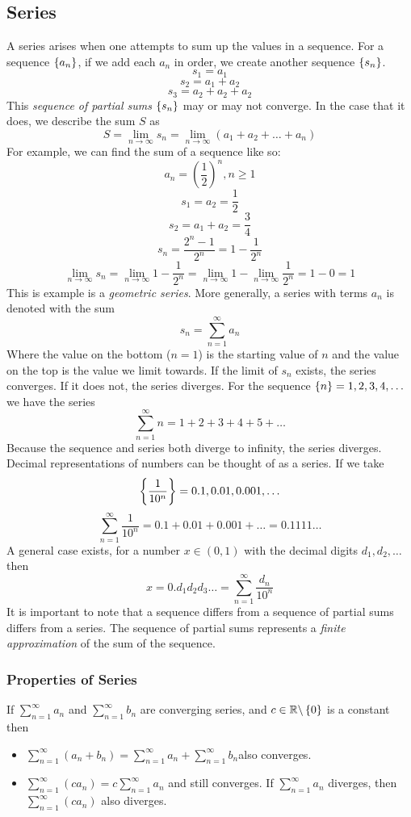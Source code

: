 \documentclass[12pt]{report}
\newcommand{\R}{\mathbb{R}}
\newcommand{\limit}{\lim\limits}
\newcommand{\sumninf}[1][1]{\sum\limits_{n = #1}^\infty}
\begin{document}
\begin{flushleft}
\subsection*{Series}
A series arises when one attempts to sum up the values in a sequence. For
a sequence \(\set{a_n}\), if we add each \(a_n\) in order, we create another
sequence \(\set{s_n}\).
\[s_1 = a_1\]
\[s_2 = a_1 + a_2\]
\[s_3 = a_2 + a_2 + a_2\]
This \textit{sequence of partial sums} \(\set{s_n}\) may or may not converge.
In the case that it does, we describe the sum \(S\) as
\[S = \limit_{n\rightarrow\infty} s_n = \limit_{n\rightarrow\infty} 
(a_1 + a_2 + \ldots + a_n)\]
For example, we can find the sum of a sequence like so:
\[a_n = \left(\frac{1}{2}\right)^n, n\geq 1\]
\[s_1 = a_2 = \frac{1}{2}\]
\[s_2 = a_1 + a_2 = \frac{3}{4}\]
\[s_n = \frac{2^n - 1}{2^n} = 1 - \frac{1}{2^n}\]
\[\limit_{n\rightarrow\infty}s_n = \limit_{n\rightarrow\infty} 1 - 
\frac{1}{2^n} = \limit_{n\rightarrow\infty} 1 - \limit_{n\rightarrow\infty} 
\frac{1}{2^n} = 1 - 0 = 1\]
This is example is a \textit{geometric series}. More generally, a series with
terms \(a_n\) is denoted with the sum
\[s_n = \sumninf a_n\]
Where the value on the bottom (\(n = 1\)) is the starting value of \(n\) and
the value on the top is the value we limit towards. If the limit of \(s_n\)
exists, the series converges. If it does not, the series diverges. For
the sequence \(\set{n} = 1, 2, 3, 4, \ldots\) we have the series
\[\sumninf n = 1 + 2 + 3 + 4 + 5 + \ldots\]
Because the sequence and series both diverge to infinity, the series diverges.
Decimal representations of numbers can be thought of as a series. If we take
\[\set{\frac{1}{10^n}} = 0.1, 0.01, 0.001, \ldots\]
\[\sumninf \frac{1}{10^n} = 0.1 + 0.01 + 0.001 + \ldots = 
0.1111\ldots\]
A general case exists, for a number \(x \in (0, 1)\) with the decimal digits
\(d_1, d_2, \ldots\) then
\[x = 0.d_1d_2d_3\ldots = \sumninf \frac{d_n}{10^n}\]
It is important to note that a sequence differs from a sequence of partial sums
differs from a series. The sequence of partial sums represents a \textit{finite
approximation} of the sum of the sequence.

\subsubsection*{Properties of Series}
If \(\sumninf a_n\) and \(\sumninf b_n\) are converging series, and 
\(c\in\R\backslash\set{0}\) is a constant then

\begin{itemize}
    \item \(\sumninf (a_n + b_n) = \sumninf a_n + \sumninf b_n\)also converges.
    \item \(\sumninf (ca_n) = c\sumninf a_n\) and still converges. If 
        \(\sumninf a_n\) diverges, then \(\sumninf (ca_n)\) also diverges.
\end{itemize}


\end{flushleft}
\end{document}
